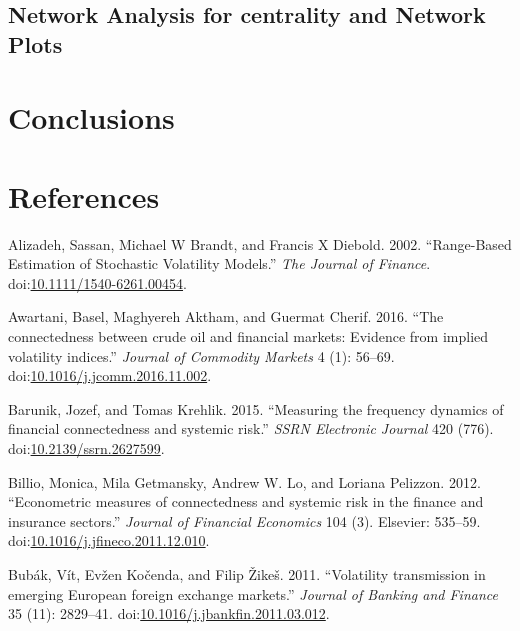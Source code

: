 \documentclass[]{elsarticle} %
\begin{document}
\subsection{Network Analysis for centrality and Network
Plots}\label{network-analysis-for-centrality-and-network-plots}

\section{Conclusions}\label{conclusions}

\section*{References}\label{references}

\hypertarget{refs}{}
\hypertarget{ref-Alizadeh2002}{}
Alizadeh, Sassan, Michael W Brandt, and Francis X Diebold. 2002.
``Range-Based Estimation of Stochastic Volatility Models.'' \emph{The
Journal of Finance}.
doi:\href{https://doi.org/10.1111/1540-6261.00454}{10.1111/1540-6261.00454}.

\hypertarget{ref-Awartani2016}{}
Awartani, Basel, Maghyereh Aktham, and Guermat Cherif. 2016. ``The
connectedness between crude oil and financial markets: Evidence from
implied volatility indices.'' \emph{Journal of Commodity Markets} 4 (1):
56--69.
doi:\href{https://doi.org/10.1016/j.jcomm.2016.11.002}{10.1016/j.jcomm.2016.11.002}.

\hypertarget{ref-Barunik2015}{}
Barunik, Jozef, and Tomas Krehlik. 2015. ``Measuring the frequency
dynamics of financial connectedness and systemic risk.'' \emph{SSRN
Electronic Journal} 420 (776).
doi:\href{https://doi.org/10.2139/ssrn.2627599}{10.2139/ssrn.2627599}.

\hypertarget{ref-Billio2012}{}
Billio, Monica, Mila Getmansky, Andrew W. Lo, and Loriana Pelizzon.
2012. ``Econometric measures of connectedness and systemic risk in the
finance and insurance sectors.'' \emph{Journal of Financial Economics}
104 (3). Elsevier: 535--59.
doi:\href{https://doi.org/10.1016/j.jfineco.2011.12.010}{10.1016/j.jfineco.2011.12.010}.

\hypertarget{ref-Bubak2011}{}
Bubák, Vít, Evžen Kočenda, and Filip Žikeš. 2011. ``Volatility
transmission in emerging European foreign exchange markets.''
\emph{Journal of Banking and Finance} 35 (11): 2829--41.
doi:\href{https://doi.org/10.1016/j.jbankfin.2011.03.012}{10.1016/j.jbankfin.2011.03.012}.
\end{document}

